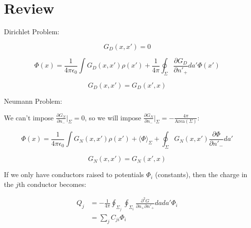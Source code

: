 \documentclass[a4paper,twoside,master.tex]{subfiles}
\begin{document}

\section{Review}%
\label{sec:review}

Dirichlet Problem:

\begin{equation}
    G_D(x,x') = 0
\end{equation}

\begin{equation}
     \Phi(x) = \frac{1}{4\pi\epsilon_0}\int G_D(x,x')\rho(x') + \frac{1}{4\pi}\oint_{\Sigma}\frac{\partial G_D}{\partial n'_+}da'\Phi(x')
\end{equation}

\begin{equation}
   G_D(x,x') = G_D(x', x)
\end{equation}

Neumann Problem:

We can't impose $\frac{\partial G_N}{\partial n_-}\bigg|_\Sigma = 0$, so we will impose $\frac{\partial G_N}{\partial n_-}\bigg|_\Sigma = -\frac{4\pi}{\text{Area}(\Sigma)}$:

\begin{equation}
   \Phi(x) = \frac{1}{4\pi\epsilon_0}\int G_N(x,x')\rho(x')+\langle\Phi\rangle_\Sigma + \oint_\Sigma G_N(x,x')\frac{\partial\Phi}{\partial n'_-} da'
\end{equation}

\begin{equation}
   G_N(x,x') = G_N(x', x)
\end{equation}

If we only have conductors raised to potentials $\Phi_i$ (constants), then the charge in the $j$th conductor becomes:

\begin{align}
Q_j &= -\frac{1}{4\pi}\oint_{\Sigma_j}\oint_{\Sigma_i}\frac{\partial^2 G}{\partial n_+\partial n'_+}dada'\Phi_i\\ &=\sum_j C_{ji}\Phi_i
\end{align}
\end{document}
